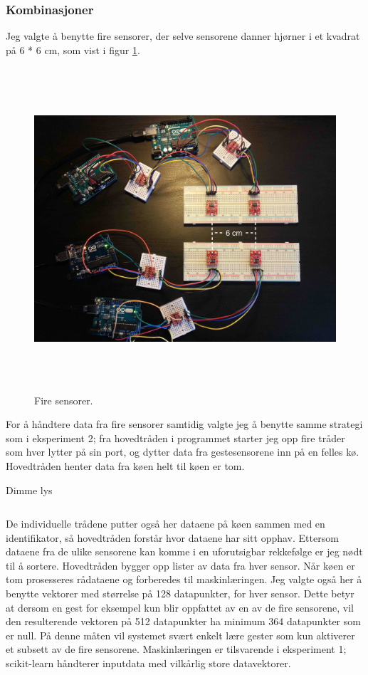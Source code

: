 \subsubsection{Kombinasjoner}
Jeg valgte å benytte fire sensorer, der selve sensorene danner hjørner i et kvadrat på 6 * 6 cm, som vist i figur \ref{fig:four-sensors}.
\begin{figure}[h]
\centering
\includegraphics[width=15cm, height=12cm]{fig/foursensors}
\caption{Fire sensorer.}
\label{fig:four-sensors}
\end{figure}
For å håndtere data fra fire sensorer samtidig valgte jeg å benytte samme strategi som i eksperiment 2; fra hovedtråden i programmet starter jeg opp fire tråder som hver lytter på sin port, og dytter data fra gestesensorene inn på en felles kø. Hovedtråden henter data fra køen helt til køen er tom.
\begin{listing}[ht]
\caption{Dimme lys}
\inputminted[fontsize=\footnotesize, linenos]{python}{kodesnutter/dimming.py}
\label{code:dim}
\end{listing}
De individuelle trådene putter også her dataene på køen sammen med en identifikator, så hovedtråden forstår hvor dataene har sitt opphav. Ettersom dataene fra de ulike sensorene kan komme i en uforutsigbar rekkefølge er jeg nødt til å sortere. Hovedtråden bygger opp lister av data fra hver sensor. Når køen er tom prosesseres rådataene og forberedes til maskinlæringen. Jeg valgte også her å benytte vektorer med størrelse på 128 datapunkter, for hver sensor. Dette betyr at dersom en gest for eksempel kun blir oppfattet av en av de fire sensorene, vil den resulterende vektoren på 512 datapunkter ha minimum 364 datapunkter som er null. På denne måten vil systemet svært enkelt lære gester som kun aktiverer et subsett av de fire sensorene. Maskinlæringen er tilsvarende i eksperiment 1; scikit-learn håndterer inputdata med vilkårlig store datavektorer.\\

